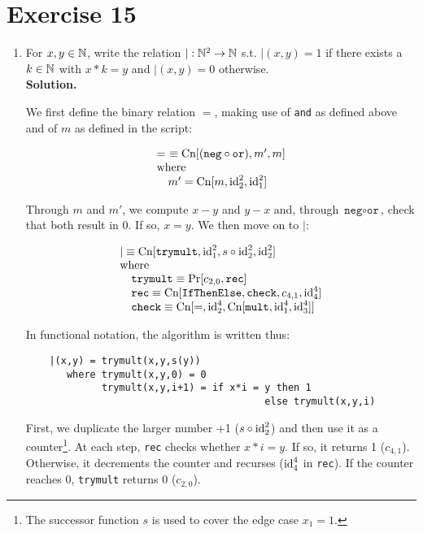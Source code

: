 \section{Exercise 15}

\begin{enumerate}
	\item For $x,y \in \mathbb{N}$, write the relation $| : \mathbb{N}^2 \rightarrow \mathbb{N}$ s.t. $|(x,y) = 1$ if there exists a $k \in \mathbb{N}$ with $x*k = y$ and $|(x,y) = 0$ otherwise.\\
	
	\textbf{Solution.}
	
	We first define the binary relation $=$, making use of \texttt{and} as defined above and of $m$ as defined in the script:
	
	$$
		\begin{array}{l}
			=\ \equiv \textnormal{Cn}[(\texttt{neg} \circ \texttt{or}), m', m]\\
			\textnormal{where}\\
			\quad m' = \textnormal{Cn}[m, \textnormal{id}^2_2, \textnormal{id}^2_1]
		\end{array}
	$$
	
	Through $m$ and $m'$, we compute $x - y$ and $y - x$ and, through $\texttt{neg} \circ \texttt{or}$, check that both result in $0$. If so, $x = y$. We then move on to $|$:
	
	$$
		\begin{array}{l}
			| \equiv \textnormal{Cn}[\texttt{trymult}, \textnormal{id}^2_1, s \circ \textnormal{id}^2_2, \textnormal{id}^2_2]\\
			\textnormal{where}\\
			\quad \texttt{trymult} \equiv \textnormal{Pr}[c_{2,0}, \texttt{rec}]\\
			\quad \texttt{rec} \equiv \textnormal{Cn}[\texttt{IfThenElse}, \texttt{check}, c_{4,1}, \textnormal{id}^4_4]\\
			\quad \texttt{check} \equiv \textnormal{Cn}[=, \textnormal{id}^4_2, \textnormal{Cn}[\texttt{mult}, \textnormal{id}^4_1, \textnormal{id}^4_3]]
		\end{array}
	$$
	
	In functional notation, the algorithm is written thus:
	\begin{verbatim}
	|(x,y) = trymult(x,y,s(y))
	   where trymult(x,y,0) = 0
	         trymult(x,y,i+1) = if x*i = y then 1
	                                     else trymult(x,y,i)
	\end{verbatim}
	
	First, we duplicate the larger number +1 ($s \circ \textnormal{id}^2_2$) and then use it as a counter\footnote{The successor function $s$ is used to cover the edge case $x_1 = 1$.}. At each step, \texttt{rec} checks whether $x*i = y$. If so, it returns 1 ($c_{4,1}$). Otherwise, it decrements the counter and recurses ($\textnormal{id}^4_4$ in \texttt{rec}). If the counter reaches 0, \texttt{trymult} returns 0 ($c_{2,0}$).
	

\end{enumerate}
